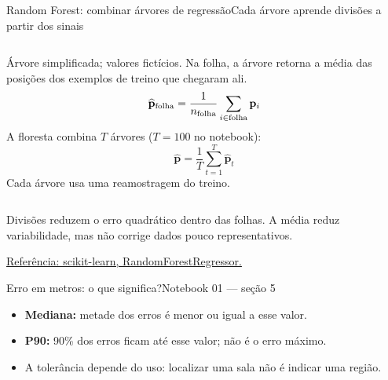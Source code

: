 \begin{frame}{Random Forest: combinar árvores de regressão}{Cada árvore aprende divisões a partir dos sinais}
\setlength{\abovedisplayskip}{4pt}\setlength{\belowdisplayskip}{4pt}
\setlength{\abovedisplayshortskip}{0pt}\setlength{\belowdisplayshortskip}{0pt}
\begin{columns}[T]
\centering
{}
\par\scriptsize Árvore simplificada; valores fictícios.
\small
Na folha, a árvore retorna a média das posições dos exemplos de treino que chegaram ali.
\[
\widehat{\mathbf p}_{\rm folha}
=\frac{1}{n_{\rm folha}}\sum_{i\in{\rm folha}}\mathbf p_i
\]
A floresta combina $T$ árvores ($T=100$ no notebook):
\[
\widehat{\mathbf p}=\frac{1}{T}\sum_{t=1}^{T}\widehat{\mathbf p}_t
\]
\footnotesize Cada árvore usa uma reamostragem do treino.
\end{columns}
\vspace{2mm}
\small Divisões reduzem o erro quadrático dentro das folhas. A média reduz variabilidade,
mas não corrige dados pouco representativos.
\par\scriptsize \href{https://scikit-learn.org/stable/modules/generated/sklearn.ensemble.RandomForestRegressor.html}{Referência: scikit-learn, RandomForestRegressor.}
\end{frame}

\begin{frame}{Erro em metros: o que significa?}{Notebook 01 — seção 5}
\centering
{}
\vspace{5mm}
\begin{itemize}
\item \textbf{Mediana:} metade dos erros é menor ou igual a esse valor.
\item \textbf{P90:} 90\% dos erros ficam até esse valor; não é o erro máximo.
\item A tolerância depende do uso: localizar uma sala não é indicar uma região.
\end{itemize}
\end{frame}

